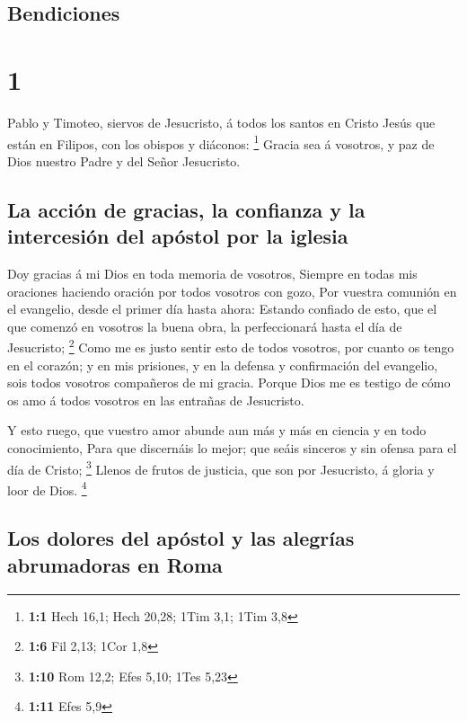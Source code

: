 \hypertarget{bendiciones}{%
\subsection{Bendiciones}\label{bendiciones}}

\hypertarget{section}{%
\section{1}\label{section}}

 Pablo y Timoteo, siervos de Jesucristo, á todos los santos
en Cristo Jesús que están en Filipos, con los obispos y diáconos:
\footnote{\textbf{1:1} Hech 16,1; Hech 20,28; 1Tim 3,1; 1Tim 3,8}
 Gracia sea á vosotros, y paz de Dios nuestro Padre y del
Señor Jesucristo.

\hypertarget{la-acciuxf3n-de-gracias-la-confianza-y-la-intercesiuxf3n-del-apuxf3stol-por-la-iglesia}{%
\subsection{La acción de gracias, la confianza y la intercesión del
apóstol por la
iglesia}\label{la-acciuxf3n-de-gracias-la-confianza-y-la-intercesiuxf3n-del-apuxf3stol-por-la-iglesia}}

 Doy gracias á mi Dios en toda memoria de vosotros,
 Siempre en todas mis oraciones haciendo oración por todos
vosotros con gozo,  Por vuestra comunión en el evangelio,
desde el primer día hasta ahora:  Estando confiado de esto,
que el que comenzó en vosotros la buena obra, la perfeccionará hasta el
día de Jesucristo; \footnote{\textbf{1:6} Fil 2,13; 1Cor 1,8}
 Como me es justo sentir esto de todos vosotros, por cuanto
os tengo en el corazón; y en mis prisiones, y en la defensa y
confirmación del evangelio, sois todos vosotros compañeros de mi gracia.
 Porque Dios me es testigo de cómo os amo á todos vosotros
en las entrañas de Jesucristo.

 Y esto ruego, que vuestro amor abunde aun más y más en
ciencia y en todo conocimiento,  Para que discernáis lo
mejor; que seáis sinceros y sin ofensa para el día de Cristo;
\footnote{\textbf{1:10} Rom 12,2; Efes 5,10; 1Tes 5,23} 
Llenos de frutos de justicia, que son por Jesucristo, á gloria y loor de
Dios. \footnote{\textbf{1:11} Efes 5,9}

\hypertarget{los-dolores-del-apuxf3stol-y-las-alegruxedas-abrumadoras-en-roma}{%
\subsection{Los dolores del apóstol y las alegrías abrumadoras en
Roma}\label{los-dolores-del-apuxf3stol-y-las-alegruxedas-abrumadoras-en-roma}}


